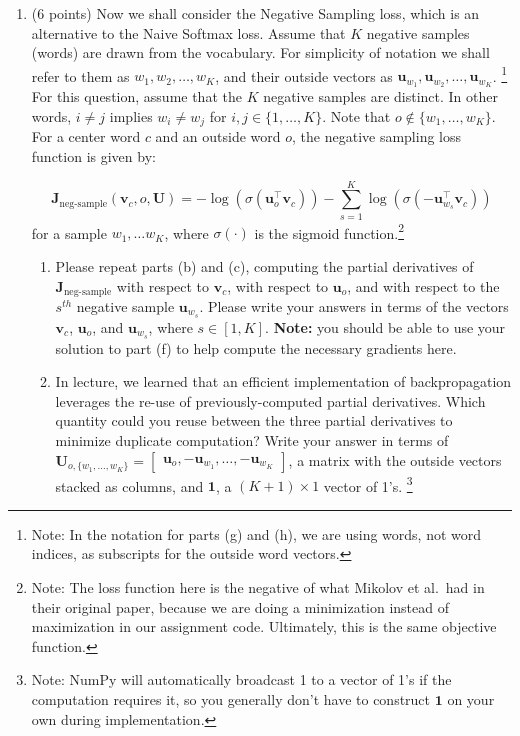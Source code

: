 \documentclass{article}
\begin{document}
\begin{enumerate}[label=(\alph*)]
\item (6 points) Now we shall consider the Negative Sampling loss, which is an alternative to the Naive Softmax loss.  Assume that $K$ negative samples (words) are drawn from the vocabulary. For simplicity of notation we shall refer to them as $w_1, w_2, \dots, w_K$, and their outside vectors as $\bm u_{w_1}, \bm u_{w_2}, \dots, \bm u_{w_K}$. \footnote{Note: In the notation for parts (g) and (h), we are using words, not word indices, as subscripts for the outside word vectors.} For this question, assume that the $K$ negative samples are distinct. In other words, $i\neq j$ implies $w_i\neq w_j$ for $i,j\in\{1,\dots,K\}$.
Note that $o\notin\{w_1, \dots, w_K\}$. 
For a center word $c$ and an outside word $o$, the negative sampling loss function is given by:

\begin{equation}
\bm J_{\text{neg-sample}}(\bm v_c, o, \bm U) = -\log(\sigma(\bm u_o^\top \bm v_c)) - \sum_{s=1}^K \log(\sigma(-\bm u_{w_s}^\top \bm v_c))
\end{equation}
for a sample $w_1, \ldots w_K$, where $\sigma(\cdot)$ is the sigmoid function.\footnote{Note: The loss function here is the negative of what Mikolov et al.\ had in their original paper, because we are doing a minimization instead of maximization in our assignment code. Ultimately, this is the same objective function.}

\begin{enumerate}[label=(\roman*)]
\item Please repeat parts (b) and (c), computing the partial derivatives of $\bm J_{\text{neg-sample}}$ with respect to $\bm v_c$, with respect to $\bm u_o$, and with respect to the $s^{th}$ negative sample $\bm u_{w_s}$. Please write your answers in terms of the vectors $\bm v_c$, $\bm u_o$, and $\bm u_{w_s}$, where $s \in [1, K]$. \textbf{Note:} you should be able to use your solution to part (f) to help compute the necessary gradients here.

\item In lecture, we learned that an efficient implementation of backpropagation leverages the re-use of previously-computed partial derivatives. Which quantity could you reuse between the three partial derivatives to minimize duplicate computation? Write your answer in terms of \\ $\bm{U}_{o, \{w_1, \dots, w_K\}} = \begin{bmatrix} \bm{u}_o, -\bm{u}_{w_1}, \dots, -\bm{u}_{w_K} \end{bmatrix}$, a matrix with the outside vectors stacked as columns, and $\bm{1}$, a $(K + 1) \times 1$ vector of 1's. \footnote{Note: NumPy will automatically broadcast 1 to a vector of 1's if the computation requires it, so you generally don't have to construct $\bm{1}$ on your own during implementation.}


\end{enumerate}
\end{enumerate}
\end{document}
